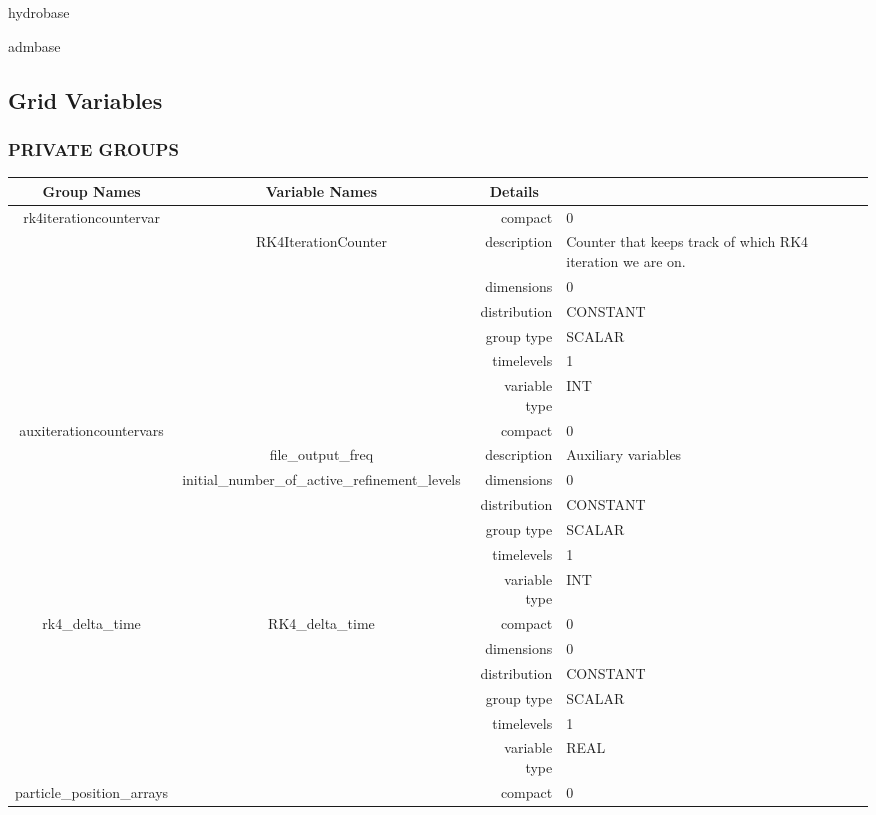 hydrobase

admbase
\vspace{2mm}
\subsection*{Grid Variables}
\vspace{5mm}\subsubsection{PRIVATE GROUPS}

\vspace{5mm}

\begin{tabular*}{150mm}{|c|c@{\extracolsep{\fill}}|rl|} \hline 
~ {\bf Group Names} ~ & ~ {\bf Variable Names} ~  &{\bf Details} ~ & ~\\ 
\hline 
rk4iterationcountervar &  & compact & 0 \\ 
 & RK4IterationCounter & description & Counter that keeps track of which RK4 iteration we are on. \\ 
 &  & dimensions & 0 \\ 
 &  & distribution & CONSTANT \\ 
 &  & group type & SCALAR \\ 
 &  & timelevels & 1 \\ 
 &  & variable type & INT \\ 
\hline 
auxiterationcountervars &  & compact & 0 \\ 
 & file\_output\_freq & description & Auxiliary variables \\ 
 & initial\_number\_of\_active\_refinement\_levels & dimensions & 0 \\ 
 &  & distribution & CONSTANT \\ 
 &  & group type & SCALAR \\ 
 &  & timelevels & 1 \\ 
 &  & variable type & INT \\ 
\hline 
rk4\_delta\_time & RK4\_delta\_time & compact & 0 \\ 
 &  & dimensions & 0 \\ 
 &  & distribution & CONSTANT \\ 
 &  & group type & SCALAR \\ 
 &  & timelevels & 1 \\ 
 &  & variable type & REAL \\ 
\hline 
particle\_position\_arrays &  & compact & 0 \\ 

\end{tabular*}
